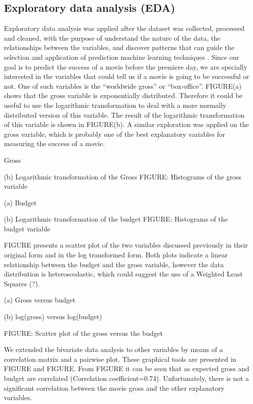 \subsection{Exploratory data analysis (EDA)}
Exploratory data analysis was applied after the dataset was collected, processed and cleaned, with the purpose of understand the nature of the data, the relationships between the variables, and discover patterns that can guide the selection and application of prediction machine learning techniques \cite{behrens1997principles}. Since our goal is to predict the success of a movie before the premiere day, we are specially interested in the variables that could tell us if a movie is going to be successful or not. One of such variables is the “worldwide gross” or “box-office”.  FIGURE(a) shows that the gross variable is exponentially distributed. Therefore it could be useful to use the logarithmic transformation to deal with a more normally distributed version of this variable. The result of the logarithmic transformation of this variable is shown in FIGURE(b). A similar exploration was applied on the gross variable, which is probably one of the best explanatory variables for measuring the success of a movie. 


Gross 

(b) Logarithmic transformation of the Gross
FIGURE: Histograms of the gross variable


(a) Budget

(b) Logarithmic transformation of the budget
FIGURE: Histograms of the budget variable

FIGURE presents a scatter plot of the two variables discussed previously in their original form and in the log transformed form. Both plots indicate a linear relationship between the budget and the gross variable, however the data distribution is heteroscedastic, which could suggest the use of a Weighted Least Squares (?). 


(a) Gross versus budget

(b) log(gross) versus log(budget) 


FIGURE: Scatter plot of the gross versus the budget

We extended the bivariate data analysis to other variables by means of a correlation matrix and a pairwise plot. These graphical tools are presented in FIGURE and FIGURE. From FIGURE it can be seen that as expected gross and budget are correlated (Correlation coefficient=0.74). Unfortunately, there is not a significant correlation between the movie gross and the other explanatory variables. 


